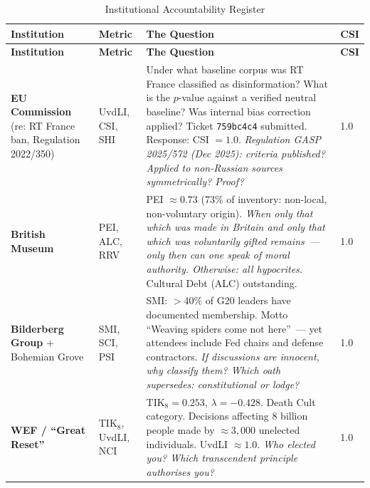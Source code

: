 \documentclass[11pt,a4paper]{article}
\theoremstyle{definition}
\theoremstyle{remark}
\begin{document}
\begin{longtable}{@{}p{}p{}
  p{}p{}@{}}
\caption{Institutional Accountability Register}
\label{tab:list-tier2}\\
\toprule
\textbf{Institution} &
\textbf{Metric} &
\textbf{The Question} &
\textbf{CSI} \\
\midrule
\endfirsthead
\toprule
\textbf{Institution} &
\textbf{Metric} &
\textbf{The Question} &
\textbf{CSI} \\
\midrule
\endhead
\bottomrule
\endlastfoot

\textbf{EU Commission}
\newline(re: RT France ban,
Regulation 2022/350)
& UvdLI, CSI, SHI
& Under what baseline corpus was RT France classified
  as disinformation?
  What is the $p$-value against a verified neutral baseline?
  Was internal bias correction applied?
  Ticket \texttt{759bc4c4} submitted.
  Response: CSI $= 1.0$.
  \newline\textit{Regulation GASP 2025/572 (Dec 2025):
  criteria published?
  Applied to non-Russian sources symmetrically? Proof?} &
  1.0 \\[6pt]

\textbf{British Museum}
& PEI, ALC, RRV
& PEI $\approx 0.73$ (73\% of inventory:
  non-local, non-voluntary origin).
  \textit{When only that which was made in Britain
  and only that which was voluntarily gifted remains~---
  only then can one speak of moral authority.
  Otherwise: all hypocrites.}
  \newline Cultural Debt (ALC) outstanding. &
  1.0 \\[6pt]

\textbf{Bilderberg Group}
\newline+ Bohemian Grove
& SMI, SCI, PSI
& SMI: $> 40\%$ of G20 leaders have documented membership.
  Motto ``Weaving spiders come not here''~---
  yet attendees include Fed chairs and defense contractors.
  \textit{If discussions are innocent, why classify them?
  Which oath supersedes:
  constitutional or lodge?} &
  1.0 \\[6pt]

\textbf{WEF / ``Great Reset''}
& TIK$_8$, UvdLI, NCI
& TIK$_8 = 0.253$, $\lambda = -0.428$.
  Death Cult category.
  Decisions affecting 8 billion people
  made by $\approx 3{,}000$ unelected individuals.
  UvdLI $\approx 1.0$.
  \textit{Who elected you?
  Which transcendent principle
  authorises you?} &
  1.0 \\[6pt]


\end{longtable}
\end{document}

